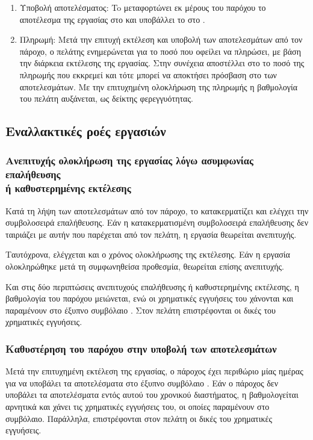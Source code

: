 \begin{enumerate}
    \item Υποβολή αποτελέσματος: To  μεταφορτώνει εκ μέρους του παρόχου το αποτέλεσμα της εργασίας στο  και υποβάλλει το  στο  \textit{}.
    \item Πληρωμή: Μετά την επιτυχή εκτέλεση και υποβολή των αποτελεσμάτων από τον πάροχο, ο πελάτης ενημερώνεται για το ποσό που οφείλει να πληρώσει, με βάση την διάρκεια εκτέλεσης της εργασίας. Στην συνέχεια αποστέλλει στο  \textit{} το ποσό της πληρωμής που εκκρεμεί και τότε μπορεί να αποκτήσει πρόσβαση στο  των αποτελεσμάτων. Με την επιτυχημένη ολοκλήρωση της πληρωμής η βαθμολογία του πελάτη αυξάνεται, ως δείκτης φερεγγυότητας.
\end{enumerate}

\subsection{Εναλλακτικές ροές εργασιών}
\subsubsection{Ανεπιτυχής ολοκλήρωση της εργασίας λόγω ασυμφωνίας επαλήθευσης \\ή καθυστερημένης εκτέλεσης}
Κατά τη λήψη των αποτελεσμάτων από τον πάροχο, το  κατακερματίζει και ελέγχει την συμβολοσειρά επαλήθευσης.
Εάν η κατακερματισμένη συμβολοσειρά επαλήθευσης δεν ταιριάζει με αυτήν που παρέχεται από τον πελάτη, η εργασία θεωρείται ανεπιτυχής.

Ταυτόχρονα, ελέγχεται και ο χρόνος ολοκλήρωσης της εκτέλεσης. Εάν η εργασία ολοκληρώθηκε μετά τη συμφωνηθείσα προθεσμία, θεωρείται επίσης ανεπιτυχής.

Και στις δύο περιπτώσεις ανεπιτυχούς επαλήθευσης ή καθυστερημένης εκτέλεσης, η βαθμολογία του παρόχου μειώνεται, ενώ οι χρηματικές εγγυήσεις του χάνονται και παραμένουν στο έξυπνο συμβόλαιο . Στον πελάτη επιστρέφονται οι δικές του χρηματικές εγγυήσεις.

\subsubsection{Καθυστέρηση του παρόχου στην υποβολή των αποτελεσμάτων}
Μετά την επιτυχημένη εκτέλεση της εργασίας, ο πάροχος έχει περιθώριο μίας ημέρας για να υποβάλει τα αποτελέσματα στο έξυπνο συμβόλαιο . Εάν ο πάροχος δεν υποβάλει τα αποτελέσματα εντός αυτού του χρονικού διαστήματος, η βαθμολογείται αρνητικά και χάνει τις χρηματικές εγγυήσεις του, οι οποίες παραμένουν στο συμβόλαιο. Παράλληλα, επιστρέφονται στον πελάτη οι δικές του χρηματικές εγγυήσεις.

